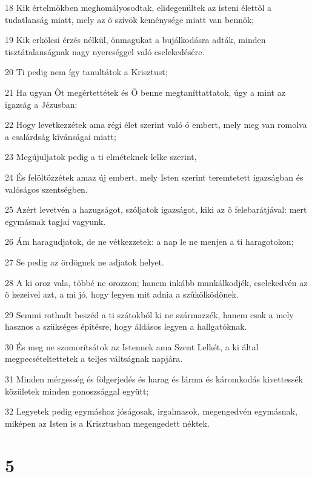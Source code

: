 \par 18 Kik értelmökben meghomályosodtak, elidegenültek az isteni élettõl a tudatlanság miatt, mely az õ szívök keménysége miatt van bennök;
\par 19 Kik erkölcsi érzés nélkül, önmagukat a bujálkodásra adták, minden tisztátalanságnak nagy nyereséggel való cselekedésére.
\par 20 Ti pedig nem így tanultátok a Krisztust;
\par 21 Ha ugyan Õt megértettétek és Õ benne megtaníttattatok, úgy a mint az igazság a Jézusban:
\par 22 Hogy levetkezzétek ama régi élet szerint való ó embert, mely meg van romolva a csalárdság kívánságai miatt;
\par 23 Megújuljatok pedig a ti elméteknek lelke szerint,
\par 24 És felöltözzétek amaz új embert, mely Isten szerint teremtetett igazságban és valóságos szentségben.
\par 25 Azért levetvén a hazugságot, szóljatok igazságot, kiki az õ felebarátjával: mert egymásnak tagjai vagyunk.
\par 26 Ám haragudjatok, de ne vétkezzetek: a nap le ne menjen a ti haragotokon;
\par 27 Se pedig az ördögnek ne adjatok helyet.
\par 28 A ki oroz vala, többé ne orozzon; hanem inkább munkálkodjék, cselekedvén az õ kezeivel azt, a mi jó, hogy legyen mit adnia a szûkölködõnek.
\par 29 Semmi rothadt beszéd a ti szátokból ki ne származzék, hanem csak a mely hasznos a szükséges építésre, hogy áldásos legyen a hallgatóknak.
\par 30 És meg ne szomorítsátok az Istennek ama Szent Lelkét, a ki által megpecsételtettetek a teljes váltságnak napjára.
\par 31 Minden mérgesség és fölgerjedés és harag és lárma és káromkodás kivettessék közületek minden gonoszsággal együtt;
\par 32 Legyetek pedig egymáshoz jóságosak, irgalmasok, megengedvén egymásnak, miképen az Isten is a Krisztusban megengedett néktek.

\chapter{5}

